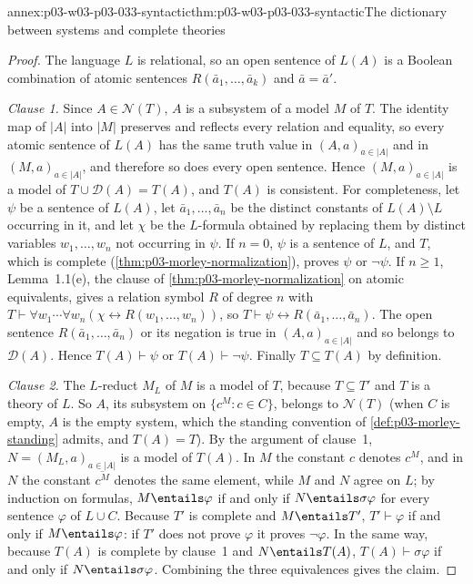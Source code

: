 \begin{annexitem}{annex:p03-w03-p03-033-syntactic}{thm:p03-w03-p03-033-syntactic}{The dictionary between systems and complete theories}
\begin{proof}
The language \(L\) is relational, so an open sentence of \(L(A)\) is a
Boolean combination of atomic sentences \(R(\bar a_1,\dots,\bar a_k)\)
and \(\bar a=\bar a'\).

\emph{Clause 1.} Since \(A\in\mathcal N(T)\), \(A\) is a subsystem of a
model \(M\) of \(T\). The identity map of \(|A|\) into \(|M|\) preserves
and reflects every relation and equality, so every atomic sentence of
\(L(A)\) has the same truth value in \((A,a)_{a\in|A|}\) and in
\((M,a)_{a\in|A|}\), and therefore so does every open sentence. Hence
\((M,a)_{a\in|A|}\) is a model of \(T\cup\mathscr D(A)=T(A)\), and
\(T(A)\) is consistent. For completeness, let \(\psi\) be a sentence of
\(L(A)\), let \(\bar a_1,\dots,\bar a_n\) be the distinct constants of
\(L(A)\setminus L\) occurring in it, and let \(\chi\) be the \(L\)-formula
obtained by replacing them by distinct variables \(w_1,\dots,w_n\) not
occurring in \(\psi\). If \(n=0\), \(\psi\) is a sentence of \(L\), and
\(T\), which is complete (\cref{thm:p03-morley-normalization}), proves
\(\psi\) or \(\neg\psi\). If \(n\geq1\), Lemma~1.1(e), the clause of
\cref{thm:p03-morley-normalization} on atomic equivalents, gives a
relation symbol \(R\) of degree \(n\) with
\(T\vdash\forall w_1\cdots\forall w_n(\chi\leftrightarrow
R(w_1,\dots,w_n))\), so \(T\vdash\psi\leftrightarrow
R(\bar a_1,\dots,\bar a_n)\). The open sentence
\(R(\bar a_1,\dots,\bar a_n)\) or its negation is true in
\((A,a)_{a\in|A|}\) and so belongs to \(\mathscr D(A)\). Hence
\(T(A)\vdash\psi\) or \(T(A)\vdash\neg\psi\). Finally \(T\subseteq T(A)\)
by definition.

\emph{Clause 2.} The \(L\)-reduct \(M_L\) of \(M\) is a model of \(T\),
because \(T\subseteq T'\) and \(T\) is a theory of \(L\). So \(A\), its
subsystem on \(\{c^M:c\in C\}\), belongs to \(\mathcal N(T)\) (when
\(C\) is empty, \(A\) is the empty system, which the standing convention
of \cref{def:p03-morley-standing} admits, and \(T(A)=T\)). By the
argument of clause~1, \(N=(M_L,a)_{a\in|A|}\) is a model of \(T(A)\). In
\(M\) the constant \(c\) denotes \(c^M\), and in \(N\) the constant
\(\overline{c^M}\) denotes the same element, while \(M\) and \(N\) agree
on \(L\); by induction on formulas, \(M\entails\varphi\) if and only if
\(N\entails\sigma\varphi\) for every sentence \(\varphi\) of \(L\cup C\).
Because \(T'\) is complete and \(M\entails T'\), \(T'\vdash\varphi\) if
and only if \(M\entails\varphi\): if \(T'\) does not prove \(\varphi\) it
proves \(\neg\varphi\). In the same way, because \(T(A)\) is complete by
clause~1 and \(N\entails T(A)\), \(T(A)\vdash\sigma\varphi\) if and only if
\(N\entails\sigma\varphi\). Combining the three equivalences gives the
claim.


\end{proof}
\end{annexitem}
